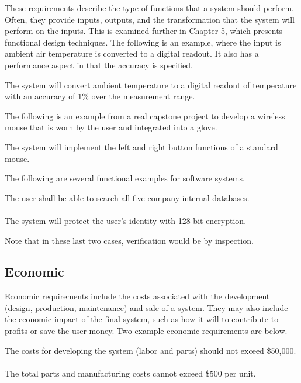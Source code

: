 These requirements describe the type of functions that a system should
perform. Often, they provide inputs, outputs, and the transformation
that the system will perform on the inputs. This is examined further in
Chapter 5, which presents functional design techniques. The following is
an example, where the input is ambient air temperature is converted to a
digital readout. It also has a performance aspect in that the accuracy
is specified.

\begin{itquote}
The system will convert ambient temperature to a digital readout of
temperature with an accuracy of 1\% over the measurement range.
\end{itquote}

The following is an example from a real capstone project to develop a
wireless mouse that is worn by the user and integrated into a glove.

\begin{itquote}
The system will implement the left and right button functions of a
standard mouse.
\end{itquote}

The following are several functional examples for software systems.

\begin{itquote}
The user shall be able to search all five company internal databases. \\ \\
The system will protect the user's identity with 128-bit encryption.
\end{itquote}

Note that in these last two cases, verification would be by inspection.


\subsection*{Economic}
\label{subsection:economic}

Economic requirements include the costs associated with the development
(design, production, maintenance) and sale of a system. They may also
include the economic impact of the final system, such as how it will to
contribute to profits or save the user money. Two example economic
requirements are below.

\begin{itquote}
The costs for developing the system (labor and parts) should not exceed
\$50,000. \\ \\
The total parts and manufacturing costs cannot exceed \$500 per unit.
\end{itquote}

